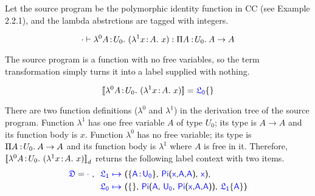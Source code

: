 \begin{exmp}Let the source program be the polymorphic identity function in CC (see Example 2.2.1), and the lambda abstrctions are tagged with integers.

\begin{equation*}
	\cdot \vdash \lambda^{0}A\hspace{0.5mm}{:}\hspace{0.5mm} U_0.\ (\lambda^{1}x\hspace{0.5mm}{:}\hspace{0.5mm} A.\ x) \mathrel{:} \Pi A\mkern1.5mu{\hspace{0.5mm}{:}\hspace{0.5mm}} U_0.\hspace{0.8mm}A \rightarrow A
\end{equation*}

The source program is a function with no free variables, so the term transformation simply turns it into a label supplied with nothing.

\begin{equation*}
	\bbracket{\lami{0}{A}{U_0}{(\lami{1}{x}{A}{x})}} = \targetlab{\flabel_0}{}
\end{equation*}

There are two function definitions ($\lambda^0$ and $\lambda^1$) in the derivation tree of the source program. 
Function $\lambda^1$ has one free variable $A$ of type $U_0$; its type is $A \rightarrow A$ and its function body is $x$. 
Function $\lambda^0$ has no free variable; its type is $\Pi A\mkern1.5mu{\hspace{0.5mm}{:}\hspace{0.5mm}} U_0.\hspace{0.8mm}A \rightarrow A$ and its function body is $\lambda^1$ where $A$ is free in it. Therefore, ${[\![ \lambda^{0}A\hspace{0.5mm}{:}\hspace{0.5mm} U_0.\ (\lambda^{1}x\hspace{0.5mm}{:}\hspace{0.5mm} A.\ x) ]\!]}_d$ returns the following label context with two items.
\begin{align*}
	\target{\fdef} = \target{\cdot}\ \sfcomma\ &\itemdef{\target{\flabel_1}}{\itemtype{A}{U_0}}{\targetpi{x}{A}{A}}{\target{x}}\sfcomma\\
	& \itemdef{\target{\flabel_0}}{}
	{\target{Pi}\textsf{(}\target{A}\sfcomma \target{U_0}\sfcomma \targetpi{x}{A}{A}\textsf{)}}
	{\targetlab{\flabel_1}{A}}
\end{align*}

\end{exmp}




